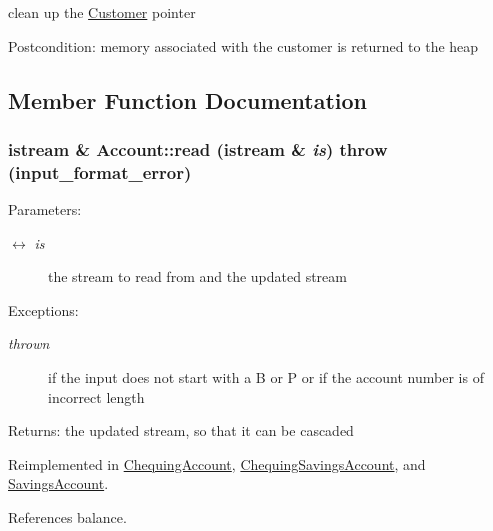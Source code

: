 clean up the \hyperlink{classCustomer}{Customer} pointer \begin{Desc}
\item[Postcondition:]memory associated with the customer is returned to the heap \end{Desc}


\subsection{Member Function Documentation}
\hypertarget{classAccount_1ef84736fe231b64547ba0b7824ac7c6}{
\subsubsection[read]{\setlength{\rightskip}{0pt plus 5cm}istream \& Account::read (istream \& {\em is})  throw (input\_\-format\_\-error)}}
\label{classAccount_1ef84736fe231b64547ba0b7824ac7c6}


\begin{Desc}
\item[Parameters:]
\begin{description}
\item[\mbox{$\leftrightarrow$} {\em is}]the stream to read from and the updated stream \end{description}
\end{Desc}
\begin{Desc}
\item[Exceptions:]
\begin{description}
\item[{\em thrown}]if the input does not start with a B or P or if the account number is of incorrect length \end{description}
\end{Desc}
\begin{Desc}
\item[Returns:]the updated stream, so that it can be cascaded \end{Desc}


Reimplemented in \hyperlink{classChequingAccount_b0aaf92f019e79f95c39a0f6996acbf5}{ChequingAccount}, \hyperlink{classChequingSavingsAccount_c0de0e2d3ac55227f31a4715ae257646}{ChequingSavingsAccount}, and \hyperlink{classSavingsAccount_a738133ea37093f4e0ae9d3a6dc14674}{SavingsAccount}.

References balance.

